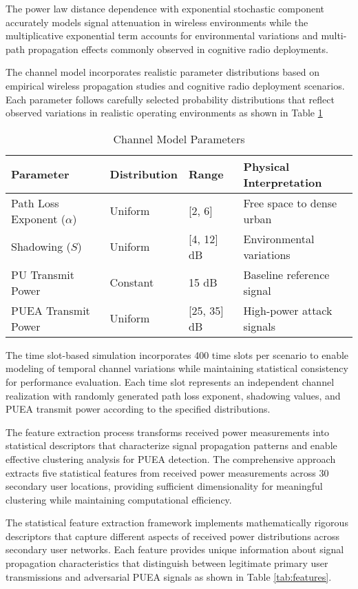 The power law distance dependence with exponential stochastic component accurately models signal attenuation in wireless environments while the multiplicative exponential term accounts for environmental variations and multi-path propagation effects commonly observed in cognitive radio deployments.

The channel model incorporates realistic parameter distributions based on empirical wireless propagation studies and cognitive radio deployment scenarios. Each parameter follows carefully selected probability distributions that reflect observed variations in realistic operating environments as shown in Table \ref{tab:channel_params}

\begin{table}[h]
\centering
\caption{Channel Model Parameters}
\label{tab:channel_params}
\begin{tabular}{|l|l|l|l|}
\hline
\textbf{Parameter} & \textbf{Distribution} & \textbf{Range} & \textbf{Physical Interpretation} \\
\hline
Path Loss Exponent ($\alpha$) & Uniform & [2, 6] & Free space to dense urban \\
Shadowing ($S$) & Uniform & [4, 12] dB & Environmental variations \\
PU Transmit Power & Constant & 15 dB & Baseline reference signal \\
PUEA Transmit Power & Uniform & [25, 35] dB & High-power attack signals \\
\hline
\end{tabular}
\end{table}

The time slot-based simulation incorporates 400 time slots per scenario to enable modeling of temporal channel variations while maintaining statistical consistency for performance evaluation. Each time slot represents an independent channel realization with randomly generated path loss exponent, shadowing values, and PUEA transmit power according to the specified distributions.

The feature extraction process transforms received power measurements into statistical descriptors that characterize signal propagation patterns and enable effective clustering analysis for PUEA detection. The comprehensive approach extracts five statistical features from received power measurements across 30 secondary user locations, providing sufficient dimensionality for meaningful clustering while maintaining computational efficiency.

The statistical feature extraction framework implements mathematically rigorous descriptors that capture different aspects of received power distributions across secondary user networks. Each feature provides unique information about signal propagation characteristics that distinguish between legitimate primary user transmissions and adversarial PUEA signals as shown in Table \ref{tab:features}.

